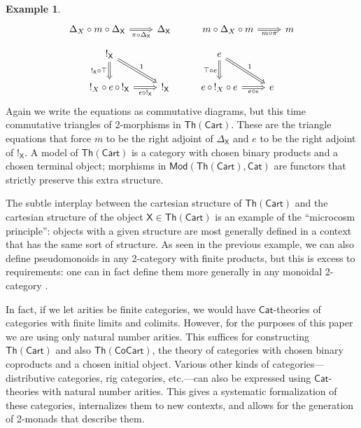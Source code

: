 \documentclass{amsart}
\theoremstyle{definition}
\newtheorem{example}[theorem]{Example}
\newcommand{\Th}{\mathsf{Th}}
\newcommand{\Cat}{\mathsf{Cat}}
\newcommand{\Mod}{\mathsf{Mod}}
\newcommand{\X}{\mathsf{X}}
\begin{document}
\begin{example}
\[\begin{tikzcd}
         \Delta_X \circ m \circ \Delta_\X \ar[Rightarrow,r,"\pi \circ \Delta_\X",swap] & \Delta_\X & 
         m \circ \Delta_X \circ m \ar[Rightarrow,r,"m \circ \pi",swap] & m
        \end{tikzcd}\]
\[\begin{tikzcd}
!_\X \ar[Rightarrow,d,"!_\X \circ \top",swap,""name=b1] \ar[Rightarrow,dr,"1"]
& &   
e \ar[Rightarrow,d,"\top \circ e",swap,""name=b1] \ar[Rightarrow,dr,"1"]  \\
         !_X \circ e \, \circ \, !_\X \ar[Rightarrow,r,"\epsilon \circ !_\X",swap] & !_\X & 
         e \, \circ \, !_X \circ e \ar[Rightarrow,r,"e \circ \epsilon",swap] & e
        \end{tikzcd}\]
Again we write the equations as commutative diagrams, but this time commutative
triangles of 2-morphisms in $\Th(\mathsf{Cart})$.  These are the triangle equations that force $m$ to be the right adjoint of $\Delta_\X$ and $e$ to be the right adjoint of $!_\X$.  A model of $\Th(\mathsf{Cart})$ is a category with chosen binary products and a chosen terminal object; morphisms in $\Mod(\Th(\mathsf{Cart}),\Cat)$ are functors that strictly preserve this extra structure.

The subtle interplay between the cartesian structure of $\Th(\mathsf{Cart})$ and the cartesian structure of the object $\X \in \Th(\mathsf{Cart})$ is an example of the ``microcosm principle'': objects with a given structure are most generally defined in a context that has the same sort of structure.   As seen in the previous example, we can also define pseudomonoids in any 2-category with finite products, but this is excess to requirements: one can in 
fact define them more generally in any monoidal 2-category \cite{pseudo}.

In fact, if we let arities be finite categories, we would have $\Cat$-theories of categories with finite limits and colimits.   However, for the purposes of this paper we are using only natural number arities.  This suffices for constructing $\Th(\mathsf{Cart})$ and also $\Th(\mathsf{CoCart})$, the theory of categories with chosen binary coproducts and a chosen initial object.   Various other kinds of categories---distributive categories, rig categories, etc.---can also be expressed using $\Cat$-theories with natural number arities. This gives a systematic formalization of these categories, internalizes them to new contexts, and allows for the generation of 2-monads that describe them.
\end{example}
\end{document}
